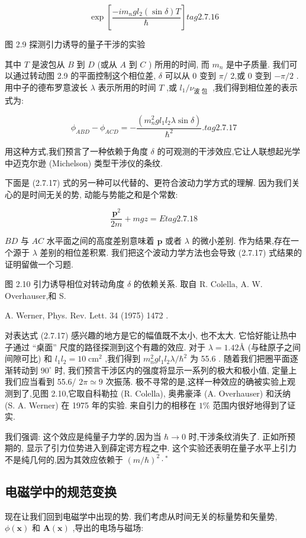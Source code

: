 \documentclass[lang=cn,newtx,10pt,scheme=chinese,thmcnt=section]{elegantbook}
\begin{document}
$$
\exp \left\lbrack \frac{-i{m}_{n}g{l}_{2}\left( {\sin \delta }\right) T}{\hbar }\right\rbrack tag{2.7.16}
$$



图 2.9 探测引力诱导的量子干涉的实验

其中 $T$ 是波包从 $B$ 到 $D$ (或从 $A$ 到 $C$ ) 所用的时间, 而 ${m}_{n}$ 是中子质量. 我们可以通过转动图 2.9 的平面控制这个相位差, $\delta$ 可以从 0 变到 $\pi /$ 2,或 0 变到 $- \pi /2$ . 用中子的德布罗意波长 $\lambda$ 表示所用的时间 $T$ ,或 ${l}_{1}/{\nu }_{\text{波 包 }}$ ,我们得到相位差的表示式为:

$$
{\phi }_{ABD} - {\phi }_{ACD} = - \frac{\left( {m}_{n}^{2}g{l}_{1}{l}_{2}\lambda \sin \delta \right) }{{\hbar }^{2}}. tag{2. 7.17}
$$

用这种方式,我们预言了一种依赖于角度 $\delta$ 的可观测的干涉效应,它让人联想起光学中迈克尔逊 (Michelson) 类型干涉仪的条纹.

下面是 (2.7.17) 式的另一种可以代替的、更符合波动力学方式的理解. 因为我们关心的是时间无关的势, 动能与势能之和是个常数:

$$
\frac{{\mathbf{p}}^{2}}{2m} + {mgz} = E tag{2. 7.18}
$$

${BD}$ 与 ${AC}$ 水平面之间的高度差别意味着 $\mathbf{p}$ 或者 $\lambda$ 的微小差别. 作为结果,存在一个源于 $\lambda$ 差别的相位差积累. 我们把这个波动力学方法也会导致 (2.7.17) 式结果的证明留做一个习题.


图 2.10 引力诱导相位对转动角度 $\delta$ 的依赖关系. 取自 R. Colella, A. W. Overhauser,和 S.

A. Werner, Phys. Rev. Lett. 34 (1975) 1472 .

对表达式 (2.7.17) 感兴趣的地方是它的幅值既不太小, 也不太大. 它恰好能让热中子通过 “桌面” 尺度的路径探测到这个有趣的效应. 对于 $\lambda = {1.42Å}$ (与硅原子之间间隙可比) 和 ${l}_{1}{l}_{2} = {10}{\mathrm{\;{cm}}}^{2}$ ,我们得到 ${m}_{n}^{2}g{l}_{1}{l}_{2}\lambda /{\hbar }^{2}$ 为 55.6 . 随着我们把圈平面逐渐转动到 ${90}^{ \circ }$ 时, 我们预言干涉区内的强度将显示一系列的极大和极小值, 定量上我们应当看到 55.6/ ${2\pi } \simeq 9$ 次振荡. 极不寻常的是,这样一种效应的确被实验上观测到了,见图 2.10,它取自科勒拉 (R. Colella), 奥弗豪泽 (A. Overhauser) 和沃纳 (S. A. Werner) 在 1975 年的实验. 来自引力的相移在 $1\%$ 范围内很好地得到了证实.

我们强调: 这个效应是纯量子力学的,因为当 $\hbar \rightarrow 0$ 时,干涉条纹消失了. 正如所预期的, 显示了引力位势进入到薛定谔方程之中. 这个实验还表明在量子水平上引力不是纯几何的,因为其效应依赖于 ${\left( m/\hbar \right) }^{2} \cdot {}^{ * }$
\subsection*{电磁学中的规范变换}
现在让我们回到电磁学中出现的势. 我们考虑从时间无关的标量势和矢量势, $\phi \left( \mathbf{x}\right)$ 和 $\mathbf{A}\left( \mathbf{x}\right)$ ,导出的电场与磁场:
\end{document}
